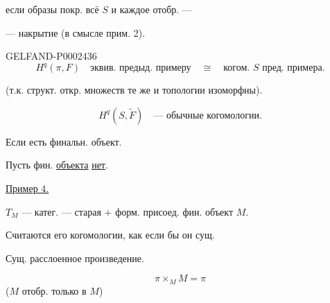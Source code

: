 если образы покр. всё $S$ и каждое отобр. —

— накрытие (в смысле прим. 2).



\begin{GelfandAdjacentEvidence}{GELFAND-P000243}{6}
\begin{equation*}
H^q(\pi,F)\quad\text{эквив. предыд. примеру}\quad\cong\quad\text{когом. $S$ пред. примера.}
\end{equation*}



(т.к. структ. откр. множеств те же и топологии изоморфны).





\begin{equation*}H^q(S,\widetilde F)\quad\text{— обычные когомологии.}\end{equation*}
\end{GelfandAdjacentEvidence}



Если есть финальн. объект.



Пусть фин. \underline{объекта} \underline{нет}.



\underline{\underline{Пример 4.}}



$T_M$ — катег. — старая $+$ форм. присоед. фин. объект $M$.



Считаются его когомологии, как если бы он сущ.



Сущ. расслоенное произведение.



\begin{equation*}\pi\times_M M=\pi\end{equation*}
($M$ отобр. только в $M$)



